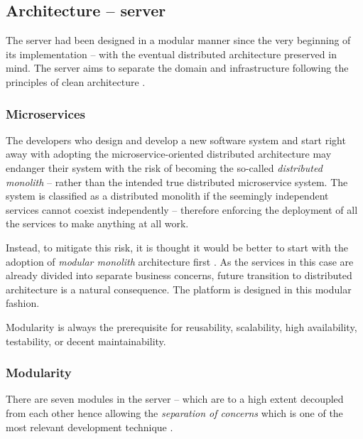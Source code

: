 \documentclass[a4paper,twoside,12pt]{book}
\begin{document}
\subsection{Architecture -- server}

The server had been designed in a modular manner since the very beginning of its implementation -- with the eventual distributed architecture preserved in mind. The server aims to separate the domain and infrastructure following the principles of clean architecture \cite{bib:clean_architecture}.

\subsubsection{Microservices}

The developers who design and develop a new software system and start right away with adopting the microservice-oriented distributed architecture may endanger their system with the risk of becoming the so-called \textit{distributed monolith} -- rather than the intended true distributed microservice system. The system is classified as a distributed monolith if the seemingly independent services cannot coexist independently -- therefore enforcing the deployment of all the services to make anything at all work.

Instead, to mitigate this risk, it is thought it would be better to start with the adoption of \textit{modular monolith} architecture first \cite{bib:boiling_frogs_modularity}. As the services in this case are already divided into separate business concerns, future transition to distributed architecture is a natural consequence. The platform is designed in this modular fashion.

Modularity is always the prerequisite for reusability, scalability, high availability, testability, or decent maintainability.

\subsubsection{Modularity}

There are seven modules in the server -- which are to a high extent decoupled from each other hence allowing the \textit{separation of concerns} which is one of the most relevant development technique \cite{bib:clean_code}.
\end{document}
